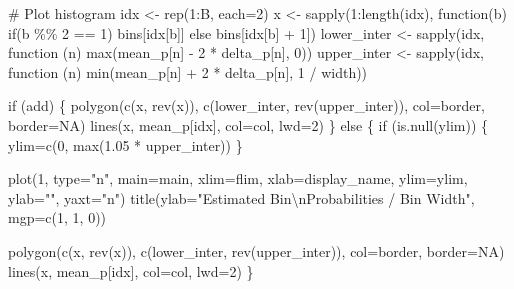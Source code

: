 \documentclass[
  letterpaper,
  DIV=11,
  numbers=noendperiod]{scrartcl}
\newenvironment{Shaded}{\begin{snugshade}}{\end{snugshade}}
\newcommand{\BuiltInTok}[1]{\textcolor[rgb]{0.00,0.23,0.31}{#1}}
\newcommand{\CharTok}[1]{\textcolor[rgb]{0.13,0.47,0.30}{#1}}
\newcommand{\CommentTok}[1]{\textcolor[rgb]{0.37,0.37,0.37}{#1}}
\newcommand{\ControlFlowTok}[1]{\textcolor[rgb]{0.00,0.23,0.31}{#1}}
\newcommand{\DecValTok}[1]{\textcolor[rgb]{0.68,0.00,0.00}{#1}}
\newcommand{\FloatTok}[1]{\textcolor[rgb]{0.68,0.00,0.00}{#1}}
\newcommand{\KeywordTok}[1]{\textcolor[rgb]{0.00,0.23,0.31}{#1}}
\newcommand{\NormalTok}[1]{\textcolor[rgb]{0.00,0.23,0.31}{#1}}
\newcommand{\OperatorTok}[1]{\textcolor[rgb]{0.37,0.37,0.37}{#1}}
\newcommand{\StringTok}[1]{\textcolor[rgb]{0.13,0.47,0.30}{#1}}
\begin{document}
\begin{Shaded}
\begin{Highlighting}[]
  \CommentTok{\# Plot histogram}
\NormalTok{  idx }\OperatorTok{\textless{}{-}}\NormalTok{ rep(}\DecValTok{1}\NormalTok{:B, each}\OperatorTok{=}\DecValTok{2}\NormalTok{)}
\NormalTok{  x }\OperatorTok{\textless{}{-}}\NormalTok{ sapply(}\DecValTok{1}\NormalTok{:length(idx), function(b) }\ControlFlowTok{if}\NormalTok{(b }\OperatorTok{\%\%} \DecValTok{2} \OperatorTok{==} \DecValTok{1}\NormalTok{) bins[idx[b]]}
              \ControlFlowTok{else}\NormalTok{ bins[idx[b] }\OperatorTok{+} \DecValTok{1}\NormalTok{])}
\NormalTok{  lower\_inter }\OperatorTok{\textless{}{-}}\NormalTok{ sapply(idx, function (n)}
    \BuiltInTok{max}\NormalTok{(mean\_p[n] }\OperatorTok{{-}} \DecValTok{2} \OperatorTok{*}\NormalTok{ delta\_p[n], }\DecValTok{0}\NormalTok{))}
\NormalTok{  upper\_inter }\OperatorTok{\textless{}{-}}\NormalTok{ sapply(idx, function (n)}
    \BuiltInTok{min}\NormalTok{(mean\_p[n] }\OperatorTok{+} \DecValTok{2} \OperatorTok{*}\NormalTok{ delta\_p[n], }\DecValTok{1} \OperatorTok{/}\NormalTok{ width))}

  \ControlFlowTok{if}\NormalTok{ (add) \{}
\NormalTok{    polygon(c(x, rev(x)), c(lower\_inter, rev(upper\_inter)),}
\NormalTok{            col}\OperatorTok{=}\NormalTok{border, border}\OperatorTok{=}\NormalTok{NA)}
\NormalTok{    lines(x, mean\_p[idx], col}\OperatorTok{=}\NormalTok{col, lwd}\OperatorTok{=}\DecValTok{2}\NormalTok{)}
\NormalTok{  \} }\ControlFlowTok{else}\NormalTok{ \{}
    \ControlFlowTok{if}\NormalTok{ (}\KeywordTok{is}\NormalTok{.null(ylim)) \{}
\NormalTok{      ylim}\OperatorTok{=}\NormalTok{c(}\DecValTok{0}\NormalTok{, }\BuiltInTok{max}\NormalTok{(}\FloatTok{1.05} \OperatorTok{*}\NormalTok{ upper\_inter))}
\NormalTok{    \}}

\NormalTok{    plot(}\DecValTok{1}\NormalTok{, }\BuiltInTok{type}\OperatorTok{=}\StringTok{"n"}\NormalTok{, main}\OperatorTok{=}\NormalTok{main,}
\NormalTok{         xlim}\OperatorTok{=}\NormalTok{flim, xlab}\OperatorTok{=}\NormalTok{display\_name,}
\NormalTok{         ylim}\OperatorTok{=}\NormalTok{ylim, ylab}\OperatorTok{=}\StringTok{""}\NormalTok{, yaxt}\OperatorTok{=}\StringTok{"n"}\NormalTok{)}
\NormalTok{    title(ylab}\OperatorTok{=}\StringTok{"Estimated Bin}\CharTok{\textbackslash{}n}\StringTok{Probabilities / Bin Width"}\NormalTok{,}
\NormalTok{          mgp}\OperatorTok{=}\NormalTok{c(}\DecValTok{1}\NormalTok{, }\DecValTok{1}\NormalTok{, }\DecValTok{0}\NormalTok{))}

\NormalTok{    polygon(c(x, rev(x)), c(lower\_inter, rev(upper\_inter)),}
\NormalTok{            col}\OperatorTok{=}\NormalTok{border, border}\OperatorTok{=}\NormalTok{NA)}
\NormalTok{    lines(x, mean\_p[idx], col}\OperatorTok{=}\NormalTok{col, lwd}\OperatorTok{=}\DecValTok{2}\NormalTok{)}
\NormalTok{  \}}


\end{Highlighting}
\end{Shaded}
\end{document}
